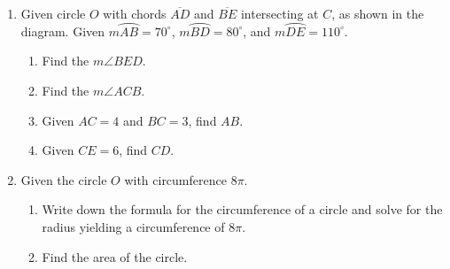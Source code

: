 \documentclass[12pt, twoside]{article}
\begin{document}
\begin{enumerate}
\newpage
\item Given circle $O$ with chords $\overline{AD}$ and $\overline{BE}$ intersecting at $C$, as shown in the diagram. Given $m \wideparen{AB}=70^\circ$, $m \wideparen{BD}=80^\circ$, and $m \wideparen{DE}=110^\circ$.
  \begin{multicols}{2}
   \raggedcolumns
   \begin{enumerate}
     \item Find the $m\angle BED$. \vspace{1.3cm}
     \item Find the $m\angle ACB$. \vspace{2cm}
     \item Given $AC=4$ and $BC=3$, find $AB$. \vspace{2cm}
     \item Given $CE=6$, find $CD$. \vspace{2cm}
   \end{enumerate}
  \end{multicols}
\vspace{2cm}

\item Given the circle $O$ with circumference $8\pi$.
  \begin{enumerate}
    \item Write down the formula for the circumference of a circle and solve for the radius yielding a circumference of $8\pi$. \vspace{1cm}
    \item Find the area of the circle.
  \end{enumerate}


\end{enumerate}
\end{document}
